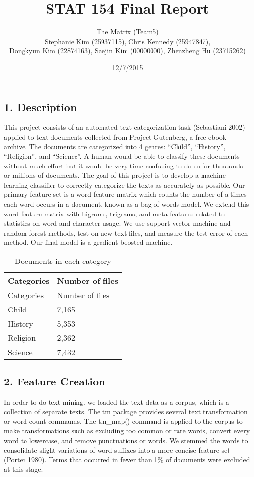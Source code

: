 \documentclass[12pt,]{article}
\title{STAT 154 Final Report}
\author{The Matrix (Team5)\\Stephanie Kim (25937115), Chris Kennedy
(25947847),\\Dongkyun Kim (22874163), Saejin Kim (00000000), Zhenzheng
Hu (23715262)}
\date{12/7/2015}
\begin{document}
\maketitle


{
\hypersetup{linkcolor=black}
\setcounter{tocdepth}{2}
\tableofcontents
}
\subsection{{1. Description}}\label{description}

This project consists of an automated text categorization task
(Sebastiani 2002) applied to text documents collected from Project
Gutenberg, a free ebook archive. The documents are categorized into 4
genres: ``Child'', ``History'', ``Religion'', and ``Science''. A human
would be able to classify these documents without much effort but it
would be very time confusing to do so for thousands or millions of
documents. The goal of this project is to develop a machine learning
classifier to correctly categorize the texts as accurately as possible.
Our primary feature set is a word-feature matrix which counts the number
of a times each word occurs in a document, known as a bag of words
model. We extend this word feature matrix with bigrams, trigrams, and
meta-features related to statistics on word and character usage. We use
support vector machine and random forest methods, test on new text
files, and measure the test error of each method. Our final model is a
gradient boosted machine.

\begin{longtable}[c]{@{}ll@{}}
\caption{Documents in each category}\tabularnewline
\toprule
Categories & Number of files\tabularnewline
\midrule
\endfirsthead
\toprule
Categories & Number of files\tabularnewline
\midrule
\endhead
Child & 7,165\tabularnewline
History & 5,353\tabularnewline
Religion & 2,362\tabularnewline
Science & 7,432\tabularnewline
\bottomrule
\end{longtable}

\subsection{{2. Feature Creation}}\label{feature-creation}

In order to do text mining, we loaded the text data as a corpus, which
is a collection of separate texts. The tm package provides several text
transformation or word count commands. The tm\_map() command is applied
to the corpus to make transformations such as excluding too common or
rare words, convert every word to lowercase, and remove punctuations or
words. We stemmed the words to consolidate slight variations of word
suffixes into a more concise feature set (Porter 1980). Terms that
occurred in fewer than 1\% of documents were excluded at this stage.
\end{document}
